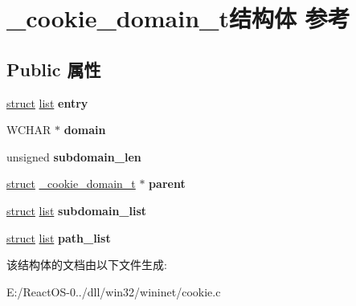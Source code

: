 \hypertarget{struct__cookie__domain__t}{}\section{\+\_\+cookie\+\_\+domain\+\_\+t结构体 参考}
\label{struct__cookie__domain__t}
\subsection*{Public 属性}
\begin{DoxyCompactItemize}
\item 
\mbox{\label{struct__cookie__domain__t_a7a3ccceaec22cfa93a37ac4b58af6264}} 
\hyperlink{interfacestruct}{struct} \hyperlink{classlist}{list} {\bfseries entry}
\item 
\mbox{\label{struct__cookie__domain__t_ade711d7ca8d893d6abc1d95549a908c2}} 
W\+C\+H\+AR $\ast$ {\bfseries domain}
\item 
\mbox{\label{struct__cookie__domain__t_ac2e4271b11d18eda86ed56b3f17c5241}} 
unsigned {\bfseries subdomain\+\_\+len}
\item 
\mbox{\label{struct__cookie__domain__t_a9f1eba4efaf40f7d9b39992864adce0a}} 
\hyperlink{interfacestruct}{struct} \hyperlink{struct__cookie__domain__t}{\+\_\+cookie\+\_\+domain\+\_\+t} $\ast$ {\bfseries parent}
\item 
\mbox{\label{struct__cookie__domain__t_a2532a33c5e53e5cca91f3bbb178bcf3f}} 
\hyperlink{interfacestruct}{struct} \hyperlink{classlist}{list} {\bfseries subdomain\+\_\+list}
\item 
\mbox{\label{struct__cookie__domain__t_ac9f87e1e765f8b1bc66854d124c22ebb}} 
\hyperlink{interfacestruct}{struct} \hyperlink{classlist}{list} {\bfseries path\+\_\+list}
\end{DoxyCompactItemize}


该结构体的文档由以下文件生成\+:\begin{DoxyCompactItemize}
\item 
E\+:/\+React\+O\+S-\/0../dll/win32/wininet/cookie.\+c\end{DoxyCompactItemize}

